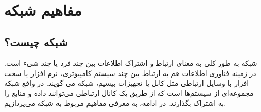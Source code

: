 \documentclass[]{article}
\begin{document}
\KashidaOff



\tableofcontents

\newpage

 \Large \textbf{\\
}


\section*{{\titr مفاهیم شبکه}}
\subsection*{{\titr شبکه چیست؟}}
شبکه به طور کلی به معنای ارتباط و اشتراک اطلاعات بین چند فرد یا چند شیء است. در زمینه فناوری اطلاعات هم به ارتباط بین چند سیستم کامپیوتری، نرم افزار یا سخت افزار با وسایل ارتباطی مثل کابل یا تجهیزات بیسیم، شبکه می گویند. در واقع شبکه مجموعه‌ای از سیستم‌ها است که از طریق یک کانال ارتباطی می‌توانند داده و منابع را به اشتراک بگذارند.
در ادامه، به معرفی مفاهیم مربوط به شبکه می‌پردازیم.
\end{document}
